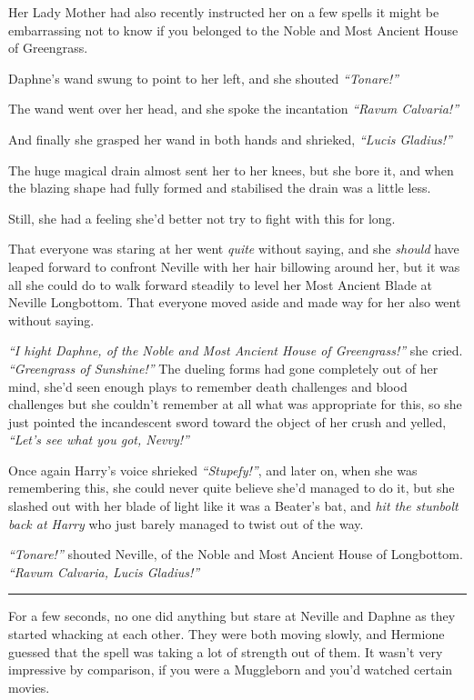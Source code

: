 Her Lady Mother had also recently instructed her on a few spells it
might be embarrassing not to know if you belonged to the Noble and Most
Ancient House of Greengrass.

Daphne's wand swung to point to her left, and she shouted
\emph{``Tonare!''}

The wand went over her head, and she spoke the incantation \emph{``Ravum
Calvaria!''}

And finally she grasped her wand in both hands and shrieked,
\emph{``Lucis Gladius!''}

The huge magical drain almost sent her to her knees, but she bore it,
and when the blazing shape had fully formed and stabilised the drain was
a little less.

Still, she had a feeling she'd better not try to fight with this for
long.

That everyone was staring at her went \emph{quite} without saying, and
she \emph{should} have leaped forward to confront Neville with her hair
billowing around her, but it was all she could do to walk forward
steadily to level her Most Ancient Blade at Neville Longbottom. That
everyone moved aside and made way for her also went without saying.

\emph{``I hight Daphne, of the Noble and Most Ancient House of
Greengrass!''} she cried. \emph{``Greengrass of Sunshine!''} The dueling
forms had gone completely out of her mind, she'd seen enough plays to
remember death challenges and blood challenges but she couldn't remember
at all what was appropriate for this, so she just pointed the
incandescent sword toward the object of her crush and yelled,
\emph{``Let's see what you got, Nevvy!''}

Once again Harry's voice shrieked \emph{``Stupefy!''}, and later on,
when she was remembering this, she could never quite believe she'd
managed to do it, but she slashed out with her blade of light like it
was a Beater's bat, and \emph{hit the stunbolt back at Harry} who just
barely managed to twist out of the way.

\emph{``Tonare!''} shouted Neville, of the Noble and Most Ancient House
of Longbottom. \emph{``Ravum Calvaria, Lucis Gladius!''}

\begin{center}\rule{3in}{0.4pt}\end{center}

For a few seconds, no one did anything but stare at Neville and Daphne
as they started whacking at each other. They were both moving slowly,
and Hermione guessed that the spell was taking a lot of strength out of
them. It wasn't very impressive by comparison, if you were a Muggleborn
and you'd watched certain movies.

